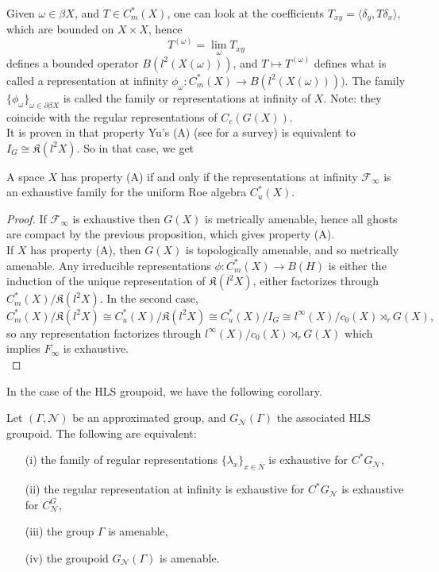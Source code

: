 Given $\omega\in \beta X$, and $T\in C_m^*(X)$, one can look at the coefficients $T_{xy}= \langle \delta_y, T\delta_x\rangle$, which are bounded on $X\times X$, hence 
\[T^{(\omega)}=\lim_{\omega} T_{xy}\]
defines a bounded operator $B(l^2(X(\omega)))$, and $T\mapsto T^{(\omega)}$ defines what is called a representation at infinity $\phi_\omega : C_m^*(X)\rightarrow B(l^2(X(\omega))))$. The family $\{\phi_{\omega}\}_{\omega\in \partial \beta X}$ is called the family or representations at infinity of $X$. Note: they coincide with the regular representations of $C_c(G(X))$. \\

It is proven in \cite{roe2014ghostbusting} that property Yu's (A) (see \cite{nowak2008property} for a survey) is equivalent to $I_G\cong \mathfrak K(l^2X)$. So in that case, we get
\begin{cor}
A space $X$ has property (A) if and only if the representations at infinity $\mathcal F_\infty$ is an exhaustive family for the uniform Roe algebra $C^*_u(X)$.
\end{cor}

\begin{proof}
If $\mathcal F_\infty$ is exhaustive then $G(X)$ is metrically amenable, hence all ghosts are compact by the previous proposition, which gives property (A).\\
If $X$ has property (A), then $G(X)$ is topologically amenable, and so metrically amenable. Any irreducible representations $\phi: C^*_m(X)\rightarrow B(H)$ is either the induction of the unique representation of $\mathfrak K(l^2X)$, either factorizes through $C^*_m(X)/\mathfrak K(l^2 X)$. In the second case, 
\[C^*_m(X)/\mathfrak K(l^2 X) \cong C^*_u(X) / \mathfrak K(l^2 X) \cong C^*_u(X) / I_G \cong l^\infty(X)/c_0(X) \rtimes_r G(X), \]
so any representation factorizes through $l^\infty(X)/c_0(X) \rtimes_r G(X)$ which implies $F_\infty $ is exhaustive.\\
\end{proof}

In the case of the HLS groupoid, we have the following corollary.

\begin{cor}
Let $(\Gamma, \mathcal N)$ be an approximated group, and $G_{\mathcal N}(\Gamma)$ the associated HLS groupoid. The following are equivalent:
\begin{itemize}
\item[(i)] the family of regular representations $\{\lambda_x\}_{x\in \overline N}$ is exhaustive for $C^*G_{\mathcal N}$,
\item[(ii)] the regular representation at infinity is exhaustive for $C^*G_{\mathcal N}$ is exhaustive for $C^G_{\mathcal N}$,
\item[(iii)] the group $\Gamma$ is amenable,
\item[(iv)] the groupoid $G_{\mathcal N}(\Gamma)$ is amenable. 
\end{itemize}
\end{cor}

